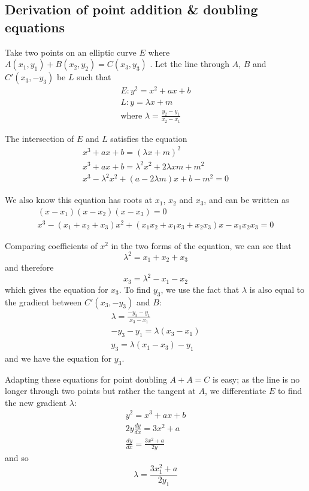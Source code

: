 \documentclass[a4paper]{article}
\begin{document}
\subsection{Derivation of point addition \& doubling equations}

Take two points on an elliptic curve $E$ where $A(x_1, y_1) + B(x_2, y_2) = C(x_3, y_3)$ . Let the line through $A$, $B$ and $C'(x_3, -y_3)$ be $L$ such that
\begin{gather*}
    E: y^2 = x^2 + ax + b \\
    L: y = \lambda x + m \\
    \text{where } \lambda = \frac{y_2-y_1}{x_2-x_1}
\end{gather*}

The intersection of $E$ and $L$ satisfies the equation
\begin{align*}
    x^3 + ax + b = (\lambda x + m)^2 \\
    x^3 + ax + b = \lambda^2 x^2 + 2 \lambda x m + m^2 \\
    x^3 - \lambda^2 x^2 + (a - 2 \lambda m)x + b - m^2 = 0
\end{align*}

We also know this equation has roots at $x_1$, $x_2$ and $x_3$, and can be written as
\begin{align*}
    (x-x_1)(x-x_2)(x-x_3)=0 \\
    x^3 - (x_1 + x_2 + x_3)x^2 + (x_1x_2 + x_1x_3 + x_2x_3)x - x_1x_2x_3 = 0
\end{align*}

Comparing coefficients of $x^2$ in the two forms of the equation, we can see that \[\lambda^2 = x_1 + x_2 + x_3\] and therefore \[x_3 = \lambda^2 - x_1 - x_2\] which gives the equation for $x_3$. To find $y_3$, we use the fact that $\lambda$ is also equal to the gradient between $C'(x_3, -y_3)$ and $B$:
\begin{align*}
    \lambda = \frac{-y_3-y_1}{x_3-x_1} \\
    -y_3 - y_1 = \lambda(x_3-x_1) \\
    y_3 = \lambda(x_1-x_3)-y_1
\end{align*}
and we have the equation for $y_3$.\cite{proof}

Adapting these equations for point doubling $A + A = C$ is easy; as the line is no longer through two points but rather the tangent at $A$, we differentiate $E$ to find the new gradient $\lambda$:
\begin{align*}
    y^2 = x^3 + ax + b \\
    2y\frac{dy}{dx} = 3x^2 + a \\
    \frac{dy}{dx} = \frac{3x^2 + a}{2y}
\end{align*}
and so \[\lambda = \frac{3x_1^2 + a}{2y_1}\]
\end{document}
